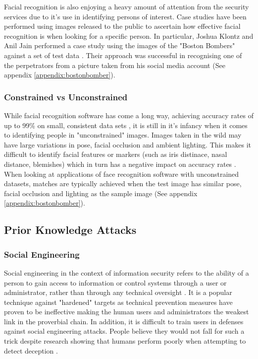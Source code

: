 \documentclass{article}
\begin{document}
Facial recognition is also enjoying a heavy amount of attention from the security services due to it's use in identifying persons of interest. Case studies have been performed using images released to the public to ascertain how effective facial recognition is when looking for a specific person. In particular, Joshua Klontz and Anil Jain performed a case study using the images of the "Boston Bombers" against a set of test data \citep{bostonbombingcasestudy}. Their approach was successful in recognising one of the perpetrators from a picture taken from his social media account (See appendix \ref{appendix:bostonbomber}).

\subsubsection{Constrained vs Unconstrained}
While facial recognition software has come a long way, achieving accuracy rates of up to 99\% on small, consistent data sets \citep{facialrecogidentifyingpoi}, it is still in it's infancy when it comes to identifying people in "unconstrained" images. Images taken in the wild may have large variations in pose, facial occlusion and ambient lighting. This makes it difficult to identify facial features or markers (such as iris distinace, nasal distance, blemishes) which in turn has a negative impact on accuracy rates \citep{unconstrainedfacialrecogbenchmark}. When looking at applications of face recognition software with unconstrained datasets, matches are typically achieved when the test image has similar pose, facial occlusion and lighting as the sample image (See appendix \ref{appendix:bostonbomber}).

\subsection{Prior Knowledge Attacks}
\subsubsection{Social Engineering}
Social engineering in the context of information security refers to the ability of a person to gain access to information or control systems through a user or administrator, rather than through any technical oversight \citep{socialengineeringvulnerabilites}. It is a popular technique against "hardened" targets as technical prevention measures have proven to be ineffective \citep{advancedsocialengineering} making the human users and administrators the weakest link in the proverbial chain. In addition, it is difficult to train users in defenses against social engineering attacks. People believe they would not fall for such a trick despite research showing that humans perform poorly when attempting to detect deception \citep{advancedsocialengineering}\citep{socialengineeringvulnerabilites}. 
\end{document}
